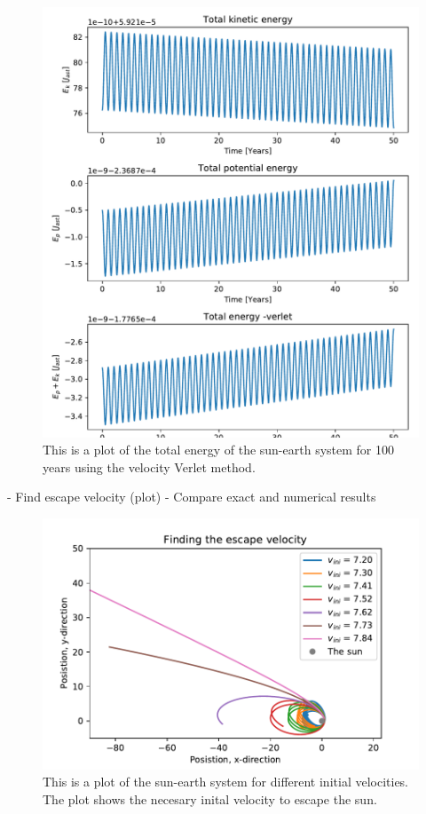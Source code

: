 \begin{figure}[H]
\includegraphics[width=1.1\linewidth]{../results/plots/totalenergy-verlet.pdf}\caption{This is a plot of the total energy of the sun-earth system for 100 years using the velocity Verlet method.}\label{fig:totalenergy-verlet}
\end{figure}

	- Find escape velocity (plot)
	 	- Compare exact and numerical results
	 	
\begin{figure}[H]
\includegraphics[width=1.1\linewidth]{../results/plots/escape_velocity.pdf}\caption{This is a plot of the sun-earth system for different initial velocities. The plot shows the necesary inital velocity to escape the sun.}\label{fig:escape_velocity}
\end{figure}

